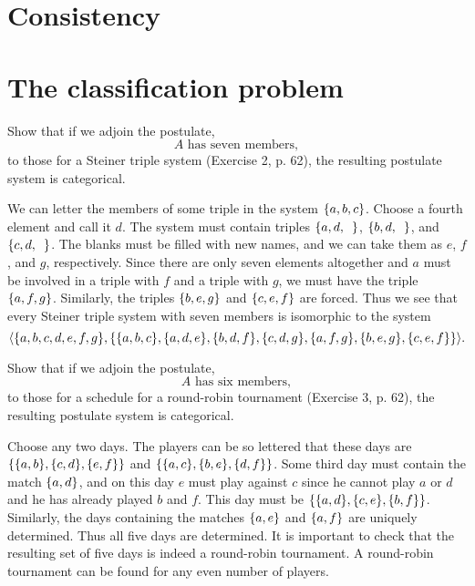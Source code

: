 \section{Consistency}

\section{The classification problem}
\begin{exercise}
Show that if we adjoin the postulate,
\[\text{$A$ has seven members},\]
to those for a Steiner triple system (Exercise 2, p. 62), the resulting postulate system is
categorical.
\end{exercise}

\begin{solution}
We can letter the members of some triple in the system $\left\{a, b, c\right\}$. Choose a fourth
element and call it $d$. The system must contain triples
$\left\{a,d,\enspace\right\}$, $\left\{b,d,\enspace\right\}$, and $\left\{c,d,\enspace\right\}$.
The blanks must be filled with new names, and we can take them as $e$, $f$, and $g$, respectively.
Since there are only seven elements altogether and $a$ must be involved in a triple
with $f$ and a triple with $g$, we must have the triple $\left\{a, f, g\right\}$. Similarly, the triples $\left\{b,e,g\right\}$
and $\left\{c,e,f\right\}$ are forced. Thus we see that every Steiner triple system with seven members
is isomorphic to the system
\[\aprn{\set{a,b,c,d,e,f,g},\set{\set{a,b,c},\set{a,d,e},\set{b,d,f},\set{c,d,g},\set{a,f,g},\set{b,e,g},\set{c,e,f}}}.\]
\end{solution}

\begin{exercise}
Show that if we adjoin the postulate,
\[\text{$A$ has six members},\]
to those for a schedule for a round-robin tournament (Exercise 3, p. 62), the resulting
postulate system is categorical.
\end{exercise}

\begin{solution}
Choose any two days.
The players can be so lettered that these days are $\set{\set{a, b},\set{c, d},\set{e, f}}$
and $\set{\set{a, c},\set{b, e},\set{d, f}}$.
Some third day must contain the match
$\left\{a, d\right\}$, and on this day $e$ must play against $c$ since he cannot play $a$ or $d$ and
he has already played $b$ and $f$.
This day must be $\set{\set{a,d},\set{c,e},\set{b,f}}$.
Similarly, the days containing
the matches $\left\{a, e\right\}$ and $\left\{a, f\right\}$ are uniquely determined.
Thus all five days are determined.
It is important to check that the resulting set of five days is indeed a round-robin
tournament. A round-robin tournament can be found for any even number of players.
\end{solution}

